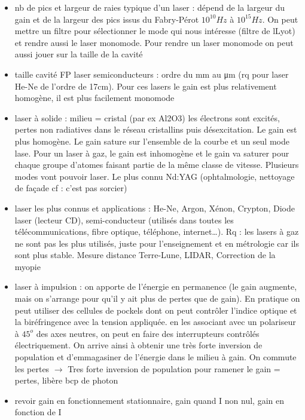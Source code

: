 \begin{remarques}
\begin{itemize}
\item nb de pics et largeur de raies typique d’un laser : dépend de la largeur du gain et de la largeur des pics issus du Fabry-Pérot $10^10 Hz$ à $10^15 Hz$. On peut mettre un filtre pour sélectionner le mode qui nous intéresse (filtre de lLyot) et rendre aussi le laser monomode. Pour rendre un laser monomode on peut aussi jouer sur la taille de la cavité
\item taille cavité FP laser semiconducteurs : ordre du mm au μm (rq pour laser He-Ne de l’ordre de 17cm). Pour ces lasers le gain est plus relativement homogène, il est plus facilement monomode
\item laser à solide : milieu = cristal (par ex Al2O3) les électrons sont excités, pertes non radiatives dans le réseau cristallins puis désexcitation. Le gain est plus homogène. Le gain sature sur l’ensemble de la courbe et un seul mode lase. Pour un laser à gaz, le gain est inhomogène et le gain va saturer pour chaque groupe d’atomes faisant partie de la même classe de vitesse. Plusieurs modes vont pouvoir laser. Le plus connu Nd:YAG (ophtalmologie, nettoyage de façade cf : c’est pas sorcier)
\item laser les plus connus et applications : He-Ne, Argon, Xénon, Crypton, Diode laser (lecteur CD), semi-conducteur (utilisés dans toutes les télécommunications, fibre optique, téléphone, internet…). Rq : les lasers à gaz ne sont pas les plus utilisés, juste pour l’enseignement et en métrologie car ils sont plus stable. Mesure distance Terre-Lune, LIDAR, Correction de la myopie
\item laser à impulsion : on apporte de l’énergie en permanence (le gain augmente, mais on s’arrange pour qu’il y
ait plus de pertes que de gain). En pratique on peut utiliser des cellules de pockels dont on peut contrôler l’indice optique et la biréfringence avec la tension appliquée. en les associant avec un polariseur à $45^o$ des axes neutres, on peut en faire des interrupteurs contrôlés électriquement. On arrive ainsi à obtenir une très forte inversion de population et d’emmagasiner de l’énergie dans le milieu à gain. On commute les pertes $\rightarrow$ Tres forte inversion de population pour ramener le gain = pertes, libère bcp de photon
\item revoir gain en fonctionnement stationnaire, gain quand I non nul, gain en fonction de I
\end{itemize}
\end{remarques}

%
%

%
%
%
%
%
